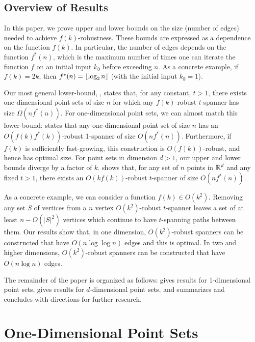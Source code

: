 \documentclass{patmorin}
\begin{document}
\subsection{Overview of Results}

In this paper, we prove upper and lower bounds on the size (number of
edges) needed to achieve $f(k)$-robustness.
These bounds are expressed as a dependence on the function $f(k)$.
In particular, the number of edges depends on the function $f^*(n)$,
which is the maximum number of times one can iterate the function $f$ on
an initial input $k_0$ before exceeding $n$.  As a concrete example, if
$f(k)=2k$, then  $f^*(n)={\lfloor \log_2 n \rfloor}$ (with the initial input $k_0=1$).

Our most general lower-bound, , states
that, for any constant, $t>1$, there exists one-dimensional point
sets of size $n$ for which any $f(k)$-robust $t$-spanner has size
$\Omega(nf^*(n))$.  For one-dimensional point sets, we can almost match
this lower-bound:  states that any one-dimensional
point set of size $n$ has an $O(f(k)f^*(k))$-robust 1-spanner of size
$O(nf^*(n))$.  Furthermore, if $f(k)$ is sufficiently fast-growing, this
construction is $O(f(k))$-robust, and hence has optimal size.  For point
sets in dimension $d>1$, our upper and lower bounds diverge by a factor
of $k$.   shows that, for any set of $n$ points in $\mathbb{R}^d$
and any fixed $t>1$, there exists an $O(kf(k))$-robust $t$-spanner of
size $O(nf^*(n))$.

As a concrete example, we can consider a function $f(k)\in O(k^2)$.
Removing any set $S$ of vertices from a $n$ vertex $O(k^2)$-robust
$t$-spanner leaves a set of at least $n-O(|S|^2)$ vertices which continue
to have $t$-spanning paths between them.  Our results show that, in
one dimension, $O(k^2)$-robust spanners can be constructed that have
$O(n\log\log n)$ edges and this is optimal.  In two and higher dimensions,
$O(k^2)$-robust spanners can be constructed that have $O(n\log n)$ edges.

The remainder of the paper is organized as follows:  
gives results for 1-dimensional point sets,  gives results
for $d$-dimensional point sets, and  summarizes and
concludes with directions for further research.


\section{One-Dimensional Point Sets}
\end{document}
